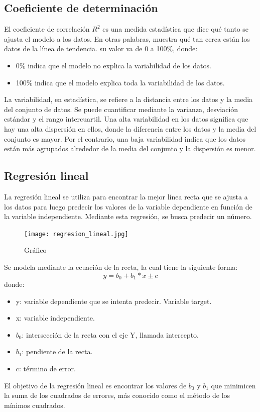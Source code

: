 \documentclass[a4paper, 12pt]{book}
\begin{document}
\subsection{Coeficiente de determinación}
El coeficiente de correlación $R^{2}$ es una medida estadística que dice qué tanto se ajusta el modelo a los datos. En otras palabras, muestra qué tan cerca están los datos de la línea de tendencia. su valor va de 0 a 100$\%$, donde:
\begin{itemize}
	\item 0$\%$ indica que el modelo no explica la variabilidad de los datos.
	\item 100$\%$ indica que el modelo explica toda la variabilidad de los datos.
\end{itemize}
La variabilidad, en estadística, se refiere a la distancia entre los datos y la media del conjunto de datos. Se puede cuantificar mediante la varianza, desviación estándar y el rango intercuartil. Una alta variabilidad en los datos significa que hay una alta dispersión en ellos, donde la diferencia entre los datos y la media del conjunto es mayor. Por el contrario, una baja variabilidad indica que los datos están más agrupados alrededor de la media del conjunto y la dispersión es menor.
\subsection{Regresión lineal}
La regresión lineal se utiliza para encontrar la mejor línea recta que se ajusta a los datos para luego predecir los valores de la variable dependiente en función de la variable independiente. Mediante esta regresión, se busca predecir un número.

\begin{figure}[H] 
	\centering 
	\texttt{[image: regresion\_lineal.jpg]}
	\caption{Gráfico}
\end{figure}

Se modela mediante la ecuación de la recta, la cual tiene la siguiente forma:
\begin{equation}
	y = b_0 + b_1 * x \pm c
\end{equation}
donde:
\begin{itemize}
	\item y: variable dependiente que se intenta predecir. Variable target.
	\item x: variable independiente.
	\item $b_0$: intersección de la recta con el eje Y, llamada intercepto.
	\item $b_1$: pendiente de la recta.
	\item c: término de error.
\end{itemize}
El objetivo de la regresión lineal es encontrar los valores de $b_0$ y $b_1$ que minimicen la suma de los cuadrados de errores, más conocido como el método de los mínimos cuadrados.
\end{document}
